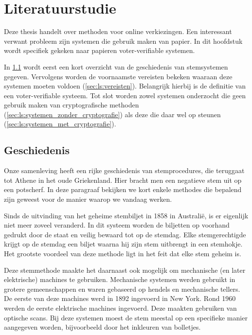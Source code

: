 % 
%

\chapter{Literatuurstudie}
\label{chap:literatuurstudie}

Deze thesis handelt over methoden voor online verkiezingen. Een interessant verwant probleem zijn systemen die gebruik maken van papier. In dit hoofdstuk wordt specifiek gekeken naar papieren voter-verifiable systemen.

\npar In \ref{sec:ls:geschiedenis} wordt eerst een kort overzicht van de geschiedenis van stemsystemen gegeven. Vervolgens worden de voornaamste vereisten bekeken waaraan deze systemen moeten voldoen (\ref{sec:ls:vereisten}). Belangrijk hierbij is de definitie van een voter-verifiable systeem. Tot slot worden zowel systemen onderzocht die geen gebruik maken van cryptografische methoden (\ref{sec:ls:systemen_zonder_cryptografie}) als deze die daar wel op steunen (\ref{sec:ls:systemen_met_cryptografie}).

\section[Geschiedenis]{Geschiedenis~\cite{adida_advances_in_cryptographic_voting_systems}}
\label{sec:ls:geschiedenis}

Onze samenleving heeft een rijke geschiedenis van stemprocedures, die teruggaat tot Athene in het oude Griekenland. Hier bracht men een negatieve stem uit op een potscherf. In deze paragraaf bekijken we kort enkele methodes die bepalend zijn geweest voor de manier waarop we vandaag werken.\cite{wiki:ostracon}

\npar Sinds de uitvinding van het geheime stembiljet in 1858 in Australi\"e, is er eigenlijk niet meer zoveel veranderd. In dit systeem worden de biljetten op voorhand gedrukt door de staat en veilig bewaard tot op de stemdag. Elke stemgerechtigde krijgt op de stemdag een biljet waarna hij zijn stem uitbrengt in een stemhokje. Het grootste voordeel van deze methode ligt in het feit dat elke stem geheim is.

\npar Deze stemmethode maakte het daarnaast ook mogelijk om mechanische (en later elektrische) machines te gebruiken. Mechanische systemen werden gebruikt in grotere gemeenschappen en waren gebaseerd op hendels en mechanische tellers. De eerste van deze machines werd in 1892 ingevoerd in New York. Rond 1960 werden de eerste elektrische machines ingevoerd. Deze maakten gebruiken van optische scans. Bij deze systemen moest de stem meestal op een specifieke manier aangegeven worden, bijvoorbeeld door het inkleuren van bolletjes.

